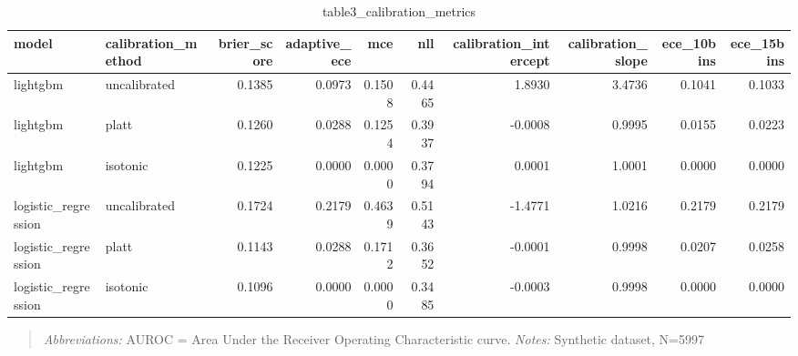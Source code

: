 \begin{table}[htbp]
\centering
\caption{table3_calibration_metrics}
\label{table3_calibration_metrics}
\begin{tabular}{llrrrrrrrr}
\toprule
model & calibration\_method & brier\_score & adaptive\_ece & mce & nll & calibration\_intercept & calibration\_slope & ece\_10bins & ece\_15bins \\
\midrule
lightgbm & uncalibrated & 0.1385 & 0.0973 & 0.1508 & 0.4465 & 1.8930 & 3.4736 & 0.1041 & 0.1033 \\
lightgbm & platt & 0.1260 & 0.0288 & 0.1254 & 0.3937 & -0.0008 & 0.9995 & 0.0155 & 0.0223 \\
lightgbm & isotonic & 0.1225 & 0.0000 & 0.0000 & 0.3794 & 0.0001 & 1.0001 & 0.0000 & 0.0000 \\
logistic\_regression & uncalibrated & 0.1724 & 0.2179 & 0.4639 & 0.5143 & -1.4771 & 1.0216 & 0.2179 & 0.2179 \\
logistic\_regression & platt & 0.1143 & 0.0288 & 0.1712 & 0.3652 & -0.0001 & 0.9998 & 0.0207 & 0.0258 \\
logistic\_regression & isotonic & 0.1096 & 0.0000 & 0.0000 & 0.3485 & -0.0003 & 0.9998 & 0.0000 & 0.0000 \\
\bottomrule
\end{tabular}

\end{table}


\begin{quote}\small
\textit{Abbreviations:} AUROC = Area Under the Receiver Operating Characteristic curve.
\textit{Notes:} Synthetic dataset, N=5997
\end{quote}